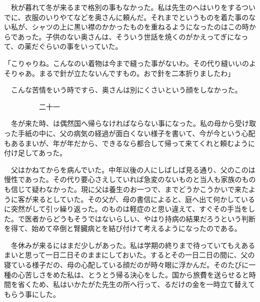 \documentclass[a4j,onecolumn]{tarticle}
\begin{document}
　秋が暮れて冬が来るまで格別の事もなかった。\hbox{}私は先生のへはいりをするついでに、\hbox{}衣服のいりやてなどを奥さんに頼んだ。\hbox{}それまでというものを着た事のない私が、\hbox{}シャツの上に黒い襟のかかったものを重ねるようになったのはこの時からであった。\hbox{}子供のない奥さんは、\hbox{}そういう世話を焼くのがかえってぎになって、\hbox{}の薬だぐらいの事をいっていた。\hbox{}\par{}
「こりゃりね。\hbox{}こんなのい着物は今まで縫った事がないわ。\hbox{}その代り縫いいのよそりゃあ。\hbox{}まるで針が立たないんですもの。\hbox{}おで針を二本折りましたわ」\par{}
　こんな苦情をいう時ですら、\hbox{}奥さんは別にくさいという顔をしなかった。\hbox{}\par{}\par{}　　　　　二十一
\par{}
　冬が来た時、\hbox{}は偶然国へ帰らなければならない事になった。\hbox{}私の母から受け取った手紙の中に、\hbox{}父の病気の経過が面白くない様子を書いて、\hbox{}今が今という心配もあるまいが、\hbox{}年が年だから、\hbox{}できるなら都合して帰って来てくれと頼むように付け足してあった。\hbox{}\par{}
　父はかねてからを病んでいた。\hbox{}中年以後の人にしばしば見る通り、\hbox{}父のこのは慢性であった。\hbox{}その代り要心さえしていれば急変のないものと当人も家族のものも信じて疑わなかった。\hbox{}現に父は養生のお一つで、\hbox{}までどうかこうかいで来たように客が来るとしていた。\hbox{}その父が、\hbox{}母の書信によると、\hbox{}庭へ出て何かしているに突然がして引ッ繰り返った。\hbox{}のものは軽症のと思い違えて、\hbox{}すぐその手当をした。\hbox{}で医者からどうもそうではないらしい、\hbox{}やはり持病の結果だろうという判断を得て、\hbox{}始めて卒倒と腎臓病とを結び付けて考えるようになったのである。\hbox{}\par{}
　冬休みが来るにはまだ少しがあった。\hbox{}私は学期の終りまで待っていてもえあるまいと思って一日二日そのままにしておいた。\hbox{}するとその一日二日の間に、\hbox{}父の寝ている様子だの、\hbox{}母の心配している顔だのが時々眼に浮かんだ。\hbox{}そのたびに一種の心苦しさをめた私は、\hbox{}とうとう帰る決心をした。\hbox{}国から旅費を送らせると時間を省くため、\hbox{}私はいかたがた先生の所へ行って、\hbox{}るだけの金を一時立て替えてもらう事にした。\hbox{}\par{}
\end{document}
